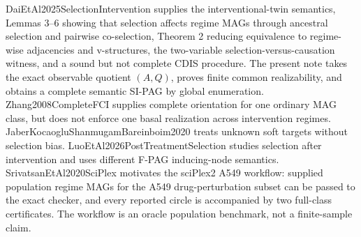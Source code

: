 DaiEtAl2025SelectionIntervention supplies the interventional-twin semantics, Lemmas 3--6 showing that selection affects regime MAGs through ancestral selection and pairwise co-selection, Theorem 2 reducing equivalence to regime-wise adjacencies and v-structures, the two-variable selection-versus-causation witness, and a sound but not complete CDIS procedure.  The present note takes the exact observable quotient \((A,Q)\), proves finite common realizability, and obtains a complete semantic SI-PAG by global enumeration.  Zhang2008CompleteFCI supplies complete orientation for one ordinary MAG class, but does not enforce one basal realization across intervention regimes.  JaberKocaogluShanmugamBareinboim2020 treats unknown soft targets without selection bias.  LuoEtAl2026PostTreatmentSelection studies selection after intervention and uses different F-PAG inducing-node semantics.  SrivatsanEtAl2020SciPlex motivates the sciPlex2 A549 workflow: supplied population regime MAGs for the A549 drug-perturbation subset can be passed to the exact checker, and every reported circle is accompanied by two full-class certificates.  The workflow is an oracle population benchmark, not a finite-sample claim.